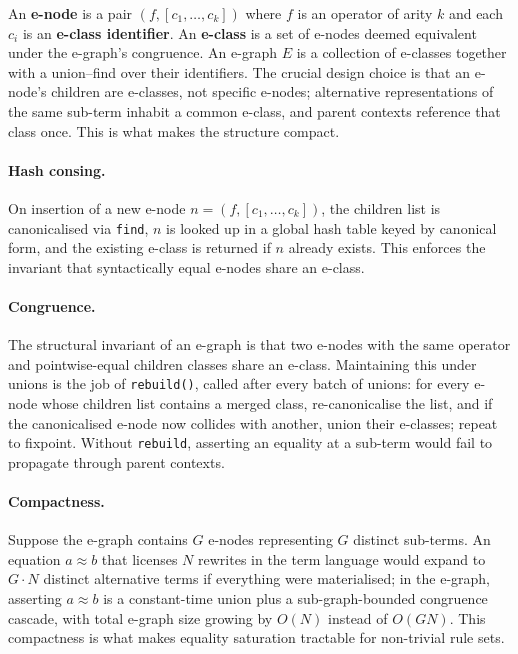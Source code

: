 \documentclass[12pt]{article}
\begin{document}
An \textbf{e-node} is a pair $(f, [c_1, \ldots, c_k])$ where $f$ is an operator of arity $k$ and each $c_i$ is an \textbf{e-class identifier}. An \textbf{e-class} is a set of e-nodes deemed equivalent under the e-graph's congruence. An e-graph $E$ is a collection of e-classes together with a union--find over their identifiers. The crucial design choice is that an e-node's children are e-classes, not specific e-nodes; alternative representations of the same sub-term inhabit a common e-class, and parent contexts reference that class once. This is what makes the structure compact.

\paragraph{Hash consing.} On insertion of a new e-node $n = (f, [c_1, \ldots, c_k])$, the children list is canonicalised via \texttt{find}, $n$ is looked up in a global hash table keyed by canonical form, and the existing e-class is returned if $n$ already exists. This enforces the invariant that syntactically equal e-nodes share an e-class.

\paragraph{Congruence.} The structural invariant of an e-graph is that two e-nodes with the same operator and pointwise-equal children classes share an e-class. Maintaining this under unions is the job of \texttt{rebuild()}, called after every batch of unions: for every e-node whose children list contains a merged class, re-canonicalise the list, and if the canonicalised e-node now collides with another, union their e-classes; repeat to fixpoint. Without \texttt{rebuild}, asserting an equality at a sub-term would fail to propagate through parent contexts.

\paragraph{Compactness.} Suppose the e-graph contains $G$ e-nodes representing $G$ distinct sub-terms. An equation $a \approx b$ that licenses $N$ rewrites in the term language would expand to $G \cdot N$ distinct alternative terms if everything were materialised; in the e-graph, asserting $a \approx b$ is a constant-time union plus a sub-graph-bounded congruence cascade, with total e-graph size growing by $O(N)$ instead of $O(GN)$. This compactness is what makes equality saturation tractable for non-trivial rule sets.
\end{document}
